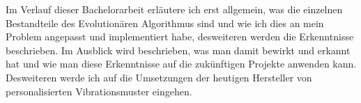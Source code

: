 
Im Verlauf dieser Bachelorarbeit erl{\"a}utere ich erst allgemein, was die einzelnen Bestandteile des Evolution{\"a}ren Algorithmus sind und wie ich dies an mein Problem angepasst und implementiert habe, desweiteren werden die Erkenntnisse beschrieben. 
Im Ausblick wird beschrieben, was man damit bewirkt und erkannt hat und wie man diese Erkenntnisse auf die zukünftigen Projekte anwenden kann. 
Desweiteren werde ich auf die Umsetzungen der heutigen Hersteller von personalisierten Vibrationsmuster eingehen.

